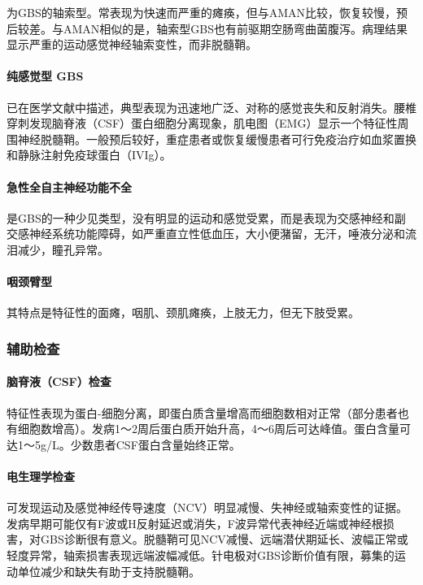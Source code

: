 为GBS的轴索型。常表现为快速而严重的瘫痪，但与AMAN比较，恢复较慢，预后较差。与AMAN相似的是，轴索型GBS也有前驱期空肠弯曲菌腹泻。病理结果显示严重的运动感觉神经轴索变性，而非脱髓鞘。

\paragraph{纯感觉型 GBS}

已在医学文献中描述，典型表现为迅速地广泛、对称的感觉丧失和反射消失。腰椎穿刺发现脑脊液（CSF）蛋白细胞分离现象，肌电图（EMG）显示一个特征性周围神经脱髓鞘。一般预后较好，重症患者或恢复缓慢患者可行免疫治疗如血浆置换和静脉注射免疫球蛋白（IVIg）。

\paragraph{急性全自主神经功能不全}

是GBS的一种少见类型，没有明显的运动和感觉受累，而是表现为交感神经和副交感神经系统功能障碍，如严重直立性低血压，大小便潴留，无汗，唾液分泌和流泪减少，瞳孔异常。

\paragraph{咽颈臂型}

其特点是特征性的面瘫，咽肌、颈肌瘫痪，上肢无力，但无下肢受累。

\subsubsection{辅助检查}

\paragraph{脑脊液（CSF）检查}

特征性表现为蛋白-细胞分离，即蛋白质含量增高而细胞数相对正常（部分患者也有细胞数增高）。发病1～2周后蛋白质开始升高，4～6周后可达峰值。蛋白含量可达1～5g/L。少数患者CSF蛋白含量始终正常。

\paragraph{电生理学检查}

可发现运动及感觉神经传导速度（NCV）明显减慢、失神经或轴索变性的证据。发病早期可能仅有F波或H反射延迟或消失，F波异常代表神经近端或神经根损害，对GBS诊断很有意义。脱髓鞘可见NCV减慢、远端潜伏期延长、波幅正常或轻度异常，轴索损害表现远端波幅减低。针电极对GBS诊断价值有限，募集的运动单位减少和缺失有助于支持脱髓鞘。

